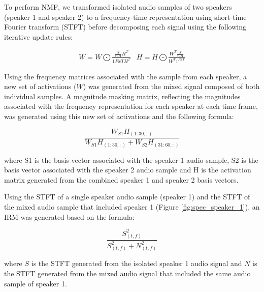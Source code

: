 \documentclass[journal, a4paper]{IEEEtran}
\begin{document}
To perform NMF, we transformed isolated audio samples of two speakers (speaker 1 and speaker 2) to a frequency-time representation using short-time Fourier transform (STFT) before decomposing each signal using the following iterative update rules:

\begin{equation}
\begin{array}{ll}
W = W \bigodot \frac{\frac{X}{WH}H^T}{1{FxT}H^T} &
H = H \bigodot \frac{W^T\frac{X}{WH}}{W^T1^{FxT}}
\end{array}
\end{equation}

Using the frequency matrices associated with the sample from each speaker, a new set of activations ($W$) was generated from the mixed signal composed of both individual samples. A magnitude masking matrix, reflecting the magnitudes associated with the frequency representation for each speaker at each time frame, was generated using this new set of activations and the following formula:

\begin{equation}
\dfrac{W_{S1}H_{(1:30,:)}}
{W_{S1}H_{(1:30,:)}+W_{S2}H_{(31:60,:)}}
\end{equation}

\begin{flushleft}
where S1 is the basis vector associated with the speaker 1 audio sample, S2 is the basis vector associated with the speaker 2 audio sample and H is the activation matrix generated from the combined speaker 1 and speaker 2 basis vectors.\cite{ClassNMF}
\end{flushleft}

Using the STFT of a single speaker audio sample (speaker 1) and the STFT of the mixed audio sample that included speaker 1 (Figure \ref{fig:spec_speaker_1}), an IRM was generated based on the formula:

\begin{equation}
\dfrac{S_{(t,f)}^2}{S_{(t,f)}^2 + N_{(t,f)}^2}
\end{equation}

\begin{flushleft}

where $S$ is the STFT generated from the isolated speaker 1 audio signal and $N$ is the STFT generated from the mixed audio signal that included the same audio sample of speaker 1.\cite{DBLP:journals/corr/abs-1708-07524}

\end{flushleft}
\end{document}
